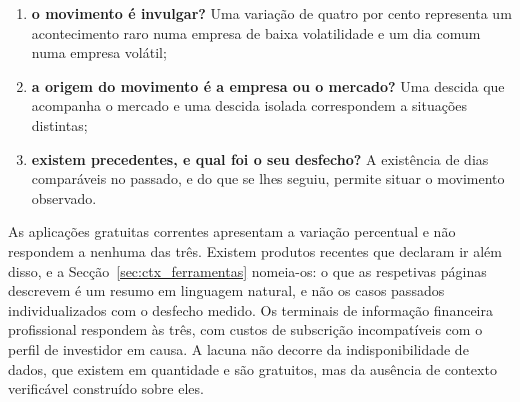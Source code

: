 \begin{enumerate}
  \item \textbf{o movimento é invulgar?} Uma variação de quatro por cento representa um
        acontecimento raro numa empresa de baixa volatilidade e um dia comum numa empresa volátil;
  \item \textbf{a origem do movimento é a empresa ou o mercado?} Uma descida que acompanha o
        mercado e uma descida isolada correspondem a situações distintas;
  \item \textbf{existem precedentes, e qual foi o seu desfecho?} A existência de dias comparáveis
        no passado, e do que se lhes seguiu, permite situar o movimento observado.
\end{enumerate}

As aplicações gratuitas correntes apresentam a variação percentual e não respondem a nenhuma
das três. Existem produtos recentes que declaram ir além disso, e a
Secção~\ref{sec:ctx_ferramentas} nomeia-os: o que as respetivas páginas descrevem é um resumo
em linguagem natural, e não os casos passados individualizados com o desfecho medido. Os
terminais de informação financeira profissional respondem às três, com custos de subscrição
incompatíveis com o perfil de investidor em causa. A lacuna não decorre da indisponibilidade de
dados, que existem em quantidade e são gratuitos, mas da ausência de contexto verificável
construído sobre eles.

